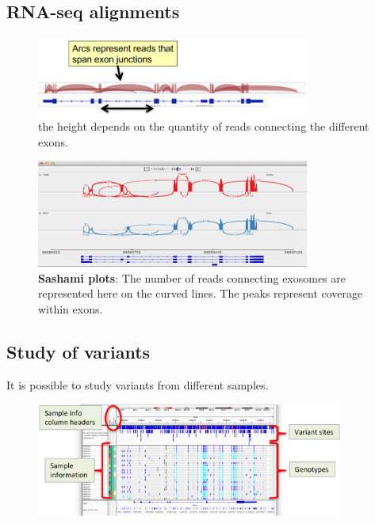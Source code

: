 \subsection{RNA-seq alignments}
\begin{figure}[H]
    \centering
    \includegraphics[width=0.8\textwidth]{RNAseqAlign.PNG}
    \caption{the height depends on the quantity of reads connecting the different exons.}
    \label{fig:RNAseq}
\end{figure}

\begin{figure}[H]
    \centering
    \includegraphics[width=0.8\textwidth]{sashamiplot.PNG}
    \caption{\textbf{Sashami plots}: The number of reads connecting exosomes are
    represented here on the curved lines. The peaks represent coverage within
    exons.}
    \label{fig:sashami}
\end{figure}

\subsection{Study of variants}
It is possible to study variants from different samples.
\begin{figure}[H]
    \centering
    \includegraphics[width=0.9\textwidth]{variantsView.PNG}
    \label{fig:variants}
\end{figure}

